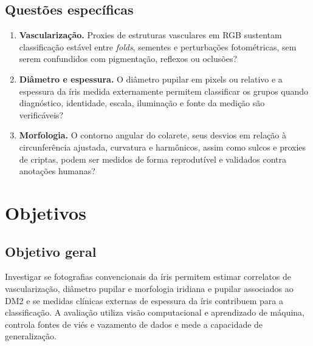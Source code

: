 \documentclass[12pt,a4paper]{article}
\begin{document}
\subsection{Questões específicas}
\begin{enumerate}
    \item \textbf{Vascularização.} Proxies de estruturas vasculares em RGB sustentam classificação
    estável entre \textit{folds}, sementes e perturbações fotométricas, sem serem confundidos com
    pigmentação, reflexos ou oclusões?

    \item \textbf{Diâmetro e espessura.} O diâmetro pupilar em pixels ou relativo e a espessura da
    íris medida externamente permitem classificar os grupos quando diagnóstico, identidade, escala,
    iluminação e fonte da medição são verificáveis?

    \item \textbf{Morfologia.} O contorno angular do colarete, seus desvios em relação à
    circunferência ajustada, curvatura e harmônicos, assim como sulcos e proxies de criptas, podem ser
    medidos de forma reprodutível e validados contra anotações humanas?
\end{enumerate}

\section{Objetivos}

\subsection{Objetivo geral}
Investigar se fotografias convencionais da íris permitem estimar correlatos de vascularização,
diâmetro pupilar e morfologia iridiana e pupilar associados ao DM2 e se medidas clínicas externas de
espessura da íris contribuem para a classificação. A avaliação utiliza visão computacional e
aprendizado de máquina, controla fontes de viés e vazamento de dados e mede a capacidade de
generalização.
\end{document}
